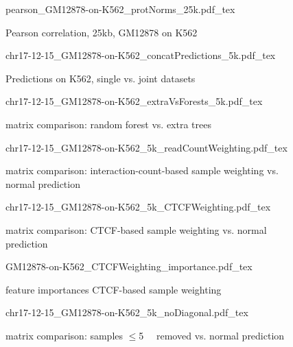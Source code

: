 \begin{appendices}
\begin{figure}[hb]
 \centering
 \scriptsize
 {pearson_GM12878-on-K562_protNorms_25k.pdf_tex}
 \caption{Pearson correlation, 25kb, GM12878 on K562}
 \label{fig:app:Pearson:GM12878:K562:chr17:protNorms:25kb}
\end{figure}

\begin{figure}[hb]
 \centering
 \scriptsize
 {chr17-12-15_GM12878-on-K562_concatPredictions_5k.pdf_tex}
 \caption{Predictions on K562, single vs. joint datasets}
 \label{fig:app:all:K562:chr17:singleVsJoint:5k}
\end{figure}

 \begin{figure}[hb]
 \centering
 \scriptsize
 {chr17-12-15_GM12878-on-K562_extraVsForests_5k.pdf_tex}
 \caption{matrix comparison: random forest vs. extra trees}
 \label{fig:app:GM12878:K562:chr17:forestVsExtratrees}
\end{figure}

 \begin{figure}[hb]
 \centering
 \scriptsize
 {chr17-12-15_GM12878-on-K562_5k_readCountWeighting.pdf_tex}
 \caption{matrix comparison: interaction-count-based sample weighting vs. normal prediction}
 \label{fig:app:GM12878:K562:chr17:interactionCountWeighting:matrices}
\end{figure}

 \begin{figure}[hb]
 \centering
 \scriptsize
 {chr17-12-15_GM12878-on-K562_5k_CTCFWeighting.pdf_tex}
 \caption{matrix comparison: CTCF-based sample weighting vs. normal prediction}
 \label{fig:app:GM12878:K562:chr17:CTCFWeighting:matrices}
\end{figure}

 \begin{figure}[hb]
 \centering
 \scriptsize
 {GM12878-on-K562_CTCFWeighting_importance.pdf_tex}
 \caption{feature importances CTCF-based sample weighting}
 \label{fig:app:GM12878:K562:chr17:CTCFWeighting:importances}
\end{figure}

 \begin{figure}[hb]
 \centering
 \scriptsize
 {chr17-12-15_GM12878-on-K562_5k_noDiagonal.pdf_tex}
 \caption{matrix comparison: samples $\leq$\SI{5}{\kilo\bp} removed vs. normal prediction}
 \label{fig:app:GM12878:K562:chr17:noDiagonal}
\end{figure}


\end{appendices}
